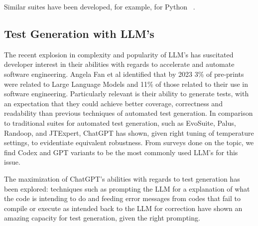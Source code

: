 Similar suites have been developed, for example, for Python ~\citep{kn:pynguin}.

\subsection{Test Generation with LLM's}

The recent explosion in complexity and popularity of LLM's has suscitated developer interest in their abilities with regards to accelerate and automate software engineering. Angela Fan et al identified that by 2023 3\% of pre-prints were related to Large Language Models and 11\% of those related to their use in software engineering.\cite{kn:angela} Particularly relevant is their ability to generate tests, with an expectation that they could achieve better coverage, correctness and readability than previous techniques of automated test generation.\cite{kn:junjiewang}
In comparison to traditional suites for automated test generation, such as EvoSuite, Palus, Randoop, and JTExpert, ChatGPT has shown, given right tuning of temperature settings, to evidentiate equivalent robustness\cite{kn:gptunitbra}.
From surveys done on the topic, we find Codex and GPT variants to be the most commonly used LLM's for this issue. \cite{kn:junjiewang}


The maximization of ChatGPT's abilities with regards to test generation has been explored: techniques such as prompting the LLM for a explanation of what the code is intending to do \cite{kn:nuances} and feeding error messages from codes that fail to compile or execute as intended back to the LLM for correction \cite{kn:chattester} have shown an amazing capacity for test generation, given the right prompting.

